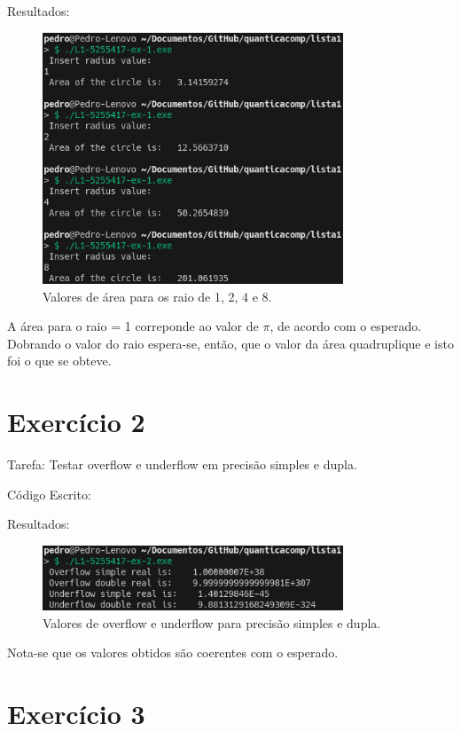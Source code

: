 \documentclass[12pt, a4paper]{article} %
\begin{document}
Resultados:
\begin{figure}[H]
    \centering
    \includegraphics[width=0.8\textwidth]{../images/results-ex1.png}
    \caption{Valores de \'area para os raio de 1, 2, 4 e 8.}
\end{figure}

A \'area para o raio = 1 correponde ao valor de $\pi$, de acordo com o esperado. Dobrando o valor do raio espera-se, então, que o valor da \'area quadruplique e isto foi o que se obteve.

\section{Exerc\'icio 2}

Tarefa: Testar overflow e underflow em precis\~ao simples e dupla.

C\'odigo Escrito:


Resultados:
\begin{figure}[H]
    \centering
    \includegraphics[width=0.8\textwidth]{../images/results-ex2.png}
    \caption{Valores de overflow e underflow para precis\~ao simples e dupla.}
\end{figure}

Nota-se que os valores obtidos s\~ao coerentes com o esperado.

\section{Exerc\'icio 3}
\end{document}
